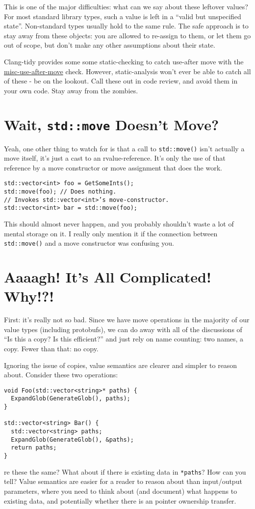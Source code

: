 This is one of the major difficulties: what can we say about these leftover values? For most standard library types, such a value is left in a \enquote{valid but unspecified state}. Non-standard types usually hold to the same rule. The safe approach is to stay away from these objects: you are allowed to re-assign to them, or let them go out of scope, but don’t make any other assumptions about their state.

Clang-tidy provides some some static-checking to catch use-after move with the \href{https://clang.llvm.org/extra/clang-tidy/checks/misc-use-after-move.html}{misc-use-after-move} check. However, static-analysis won’t ever be able to catch all of these - be on the lookout. Call these out in code review, and avoid them in your own code. Stay away from the zombies.

\section{Wait, \texorpdfstring{\texttt{std::move}}{} Doesn’t Move?}
Yeah, one other thing to watch for is that a call to \texttt{std::move()} isn’t actually a move itself, it’s just a cast to an rvalue-reference. It’s only the use of that reference by a move constructor or move assignment that does the work.

\begin{verbatim}
std::vector<int> foo = GetSomeInts();
std::move(foo); // Does nothing.
// Invokes std::vector<int>’s move-constructor.
std::vector<int> bar = std::move(foo);
\end{verbatim}

This should almost never happen, and you probably shouldn’t waste a lot of mental storage on it. I really only mention it if the connection between \texttt{std::move()} and a move constructor was confusing you.

\section{Aaaagh! It’s All Complicated! Why!?!}
First: it’s really not so bad. Since we have move operations in the majority of our value types (including protobufs), we can do away with all of the discussions of \enquote{Is this a copy? Is this efficient?} and just rely on name counting: two names, a copy. Fewer than that: no copy.

Ignoring the issue of copies, value semantics are clearer and simpler to reason about. Consider these two operations:
\begin{verbatim}
void Foo(std::vector<string>* paths) {
  ExpandGlob(GenerateGlob(), paths);
}

std::vector<string> Bar() {
  std::vector<string> paths;
  ExpandGlob(GenerateGlob(), &paths);
  return paths;
}
\end{verbatim}
re these the same? What about if there is existing data in \texttt{*paths}? How can you tell? Value semantics are easier for a reader to reason about than input/output parameters, where you need to think about (and document) what happens to existing data, and potentially whether there is an pointer ownership transfer.

